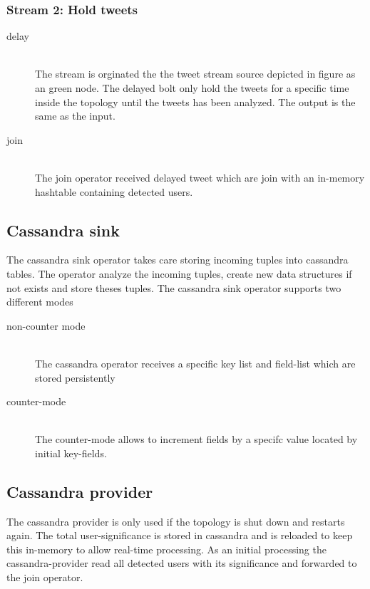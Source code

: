 \subsubsection{Stream 2: Hold tweets}
\begin{description}
  \item[delay] \hfill \\
      The stream is orginated the the tweet stream source depicted in figure as an green node. The delayed bolt only hold the tweets for a specific time inside the topology until the tweets has been analyzed. The output is the same as the input.

  \item[join] \hfill \\
	The join operator received delayed tweet which are join with an in-memory hashtable containing detected users.
\end{description}

\subsection{Cassandra sink}
The cassandra sink operator takes care storing incoming tuples into cassandra tables. The operator analyze the incoming tuples, create new data structures if not exists and store theses tuples. The cassandra sink operator supports two different modes
\begin{description}
  \item[non-counter mode] \hfill \\
	The cassandra operator receives a specific key list and field-list which are stored persistently 
  \item[counter-mode] \hfill \\
       The counter-mode allows to increment fields by a specifc value located by initial key-fields.
\end{description}


\subsection{Cassandra provider}

The cassandra provider is only used if the topology is shut down and restarts again. The total user-significance is stored in cassandra and is reloaded to keep this in-memory to allow real-time processing. As an initial processing the cassandra-provider read all detected users with its significance and forwarded to the join operator. 

